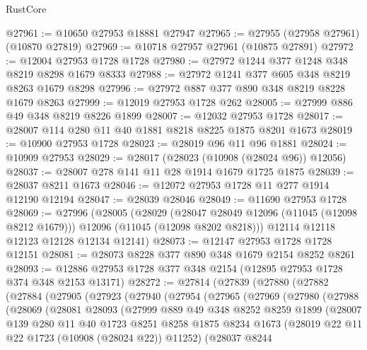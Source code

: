 \begin{lexlean}{RustCore}
\begin{coremodule}
@27961 := @10650 @27953 @18881 @27947
@27965 := @27955 (@27958 @27961) (@10870 @27819)
@27969 := @10718 @27957 @27961 (@10875 @27891)
@27972 := @12004 @27953 @1728 @1728
@27980 := @27972 @1244 @377 @1248 @348 @8219 @8298 @1679 @8333
@27988 := @27972 @1241 @377 @605 @348 @8219 @8263 @1679 @8298
@27996 := @27972 @887 @377 @890 @348 @8219 @8228 @1679 @8263
@27999 := @12019 @27953 @1728 @262
@28005 := @27999 @886 @49 @348 @8219 @8226 @1899
@28007 := @12032 @27953 @1728
@28017 := @28007 @114 @280 @11 @40 @1881 @8218 @8225 @1875 @8201 @1673
@28019 := @10900 @27953 @1728
@28023 := @28019 @96 @11 @96 @1881
@28024 := @10909 @27953
@28029 := @28017 (@28023 (@10908 (@28024 @96)) @12056)
@28037 := @28007 @278 @141 @11 @28 @1914 @1679 @1725 @1875
@28039 := @28037 @8211 @1673
@28046 := @12072 @27953 @1728 @11 @277 @1914 @12190 @12194
@28047 := @28039 @28046
@28049 := @11690 @27953 @1728
@28069 := @27996
    (@28005
      (@28029
        (@28047 @28049 @12096 (@11045 (@12098 @8212 @1679)))
        @12096
        (@11045 (@12098 @8202 @8218)))
      @12114
      @12118
      @12123
      @12128
      @12134
      @12141)
@28073 := @12147 @27953 @1728 @1728 @12151
@28081 := @28073 @8228 @377 @890 @348 @1679 @2154 @8252 @8261
@28093 := @12886 @27953 @1728 @377 @348 @2154 (@12895 @27953 @1728 @374 @348 @2153 @13171)
@28272 := @27814
    (@27839
      (@27880
        (@27882
          (@27884
            (@27905
              (@27923
                (@27940
                  (@27954
                    (@27965
                      (@27969
                        (@27980
                          (@27988
                            (@28069
                              (@28081
                                @28093
                                (@27999
                                  @889
                                  @49
                                  @348
                                  @8252
                                  @8259
                                  @1899
                                  (@28007
                                    @139
                                    @280
                                    @11
                                    @40
                                    @1723
                                    @8251
                                    @8258
                                    @1875
                                    @8234
                                    @1673
                                    (@28019 @22 @11 @22 @1723 (@10908 (@28024 @22)) @11252)
                                    (@28037
                                      @8244

\end{coremodule}
\end{lexlean}

